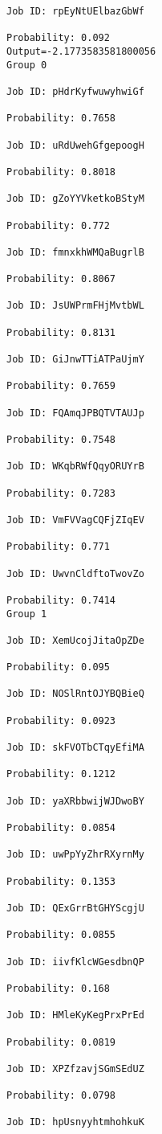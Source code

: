 \documentclass[11pt]{article}
\begin{document}
\begin{Verbatim}[commandchars=\\\{\}]
Job ID: rpEyNtUElbazGbWf

Probability: 0.092
Output=-2.1773583581800056
Group 0

Job ID: pHdrKyfwuwyhwiGf

Probability: 0.7658

Job ID: uRdUwehGfgepoogH

Probability: 0.8018

Job ID: gZoYYVketkoBStyM

Probability: 0.772

Job ID: fmnxkhWMQaBugrlB

Probability: 0.8067

Job ID: JsUWPrmFHjMvtbWL

Probability: 0.8131

Job ID: GiJnwTTiATPaUjmY

Probability: 0.7659

Job ID: FQAmqJPBQTVTAUJp

Probability: 0.7548

Job ID: WKqbRWfQqyORUYrB

Probability: 0.7283

Job ID: VmFVVagCQFjZIqEV

Probability: 0.771

Job ID: UwvnCldftoTwovZo

Probability: 0.7414
Group 1

Job ID: XemUcojJitaOpZDe

Probability: 0.095

Job ID: NOSlRntOJYBQBieQ

Probability: 0.0923

Job ID: skFVOTbCTqyEfiMA

Probability: 0.1212

Job ID: yaXRbbwijWJDwoBY

Probability: 0.0854

Job ID: uwPpYyZhrRXyrnMy

Probability: 0.1353

Job ID: QExGrrBtGHYScgjU

Probability: 0.0855

Job ID: iivfKlcWGesdbnQP

Probability: 0.168

Job ID: HMleKyKegPrxPrEd

Probability: 0.0819

Job ID: XPZfzavjSGmSEdUZ

Probability: 0.0798

Job ID: hpUsnyyhtmhohkuK


\end{Verbatim}
\end{document}
